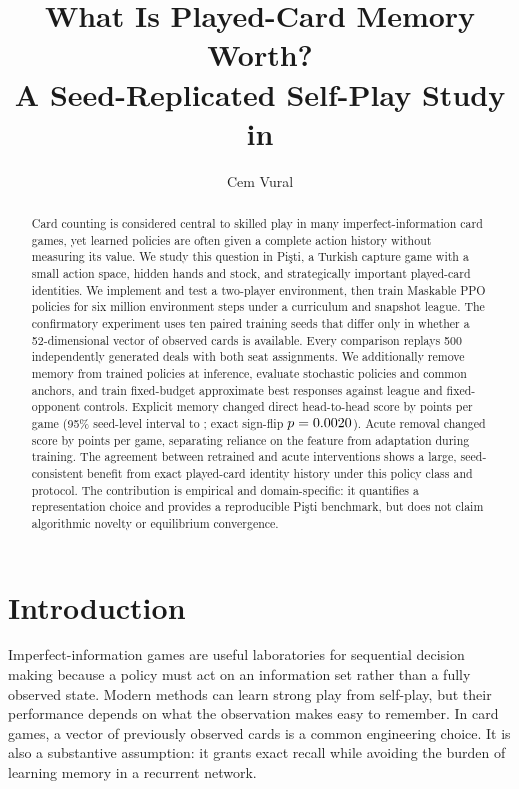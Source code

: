 \documentclass[10pt]{article}
\title{What Is Played-Card Memory Worth?\\
A Seed-Replicated Self-Play Study in \pisti}
\author{Cem Vural}
\date{}
\newcommand{\pisti}{Pişti}
\begin{document}
\maketitle

\begin{abstract}
Card counting is considered central to skilled play in many imperfect-information card games, yet learned policies are often given a complete action history without measuring its value. We study this question in \pisti, a Turkish capture game with a small action space, hidden hands and stock, and strategically important played-card identities. We implement and test a two-player environment, then train Maskable PPO policies for six million environment steps under a curriculum and snapshot league. The confirmatory experiment uses ten paired training seeds that differ only in whether a 52-dimensional vector of observed cards is available. Every comparison replays 500 independently generated deals with both seat assignments. We additionally remove memory from trained policies at inference, evaluate stochastic policies and common anchors, and train fixed-budget approximate best responses against league and fixed-opponent controls. Explicit memory changed direct head-to-head score by \DirectMean{} points per game (95\% seed-level interval \DirectCILow{} to \DirectCIHigh{}; exact sign-flip $p=0.0020$). Acute removal changed score by \AcuteMean{} points per game, separating reliance on the feature from adaptation during training. The agreement between retrained and acute interventions shows a large, seed-consistent benefit from exact played-card identity history under this policy class and protocol. The contribution is empirical and domain-specific: it quantifies a representation choice and provides a reproducible \pisti{} benchmark, but does not claim algorithmic novelty or equilibrium convergence.
\end{abstract}

\section{Introduction}

Imperfect-information games are useful laboratories for sequential decision making because a policy must act on an information set rather than a fully observed state. Modern methods can learn strong play from self-play, but their performance depends on what the observation makes easy to remember. In card games, a vector of previously observed cards is a common engineering choice. It is also a substantive assumption: it grants exact recall while avoiding the burden of learning memory in a recurrent network.
\end{document}
